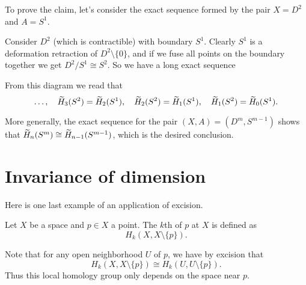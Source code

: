 To prove the claim, let's consider the exact sequence
formed by the pair $X = D^2$ and $A = S^1$.
\begin{example}[The long exact sequence for $(X,A) = (D^2, S^1)$]
	Consider $D^2$ (which is contractible) with boundary $S^1$.
	Clearly $S^1$ is a deformation retraction of $D^2 \setminus \{0\}$,
	and if we fuse all points on the boundary together we get $D^2 / S^1 \cong S^2$.
	So we have a long exact sequence
	\begin{center}
	\end{center}
	From this diagram we read that
	\[
		\dots, \quad
		\widetilde H_3(S^2) = \widetilde H_2(S^1), \quad
		\widetilde H_2(S^2) = \widetilde H_1(S^1), \quad
		\widetilde H_1(S^2) = \widetilde H_0(S^1).
	\]
\end{example}
More generally, the exact sequence for the pair $(X,A) = (D^m, S^{m-1})$
shows that $\widetilde H_n(S^m) \cong \widetilde H_{n-1}(S^{m-1})$,
which is the desired conclusion.

\section{Invariance of dimension}
Here is one last example of an application of excision.
\begin{definition}
	Let $X$ be a space and $p \in X$ a point.
	The $k$th  of $p$ at $X$ is defined as
	\[ H_k(X, X \setminus \{p\}). \]
\end{definition}
Note that for any open neighborhood $U$ of $p$, we have by excision that
\[ H_k(X, X \setminus \{p\}) \cong H_k(U, U \setminus \{p\}). \]
Thus this local homology group only depends on the space near $p$.

